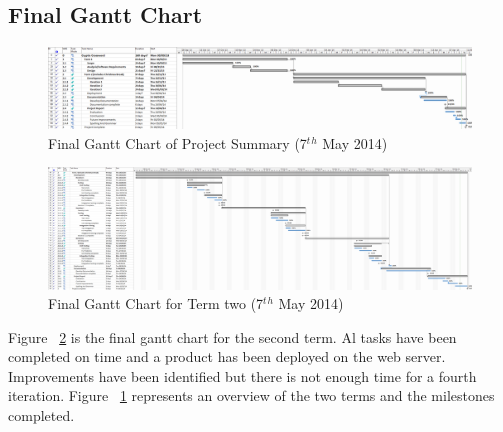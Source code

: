 \begin{landscape}
\subsection{Final Gantt Chart}

\begin{figure}[H]
  \centering
  \includegraphics[width=\linewidth]{images/gant_chart_final_overview.png}
  \caption{Final Gantt Chart of Project Summary (7$^t$$^h$ May 2014)}
  \label{fig:ganttfinaloverview}
\end{figure}

\begin{figure}[H]
  \centering
  \includegraphics[width=\linewidth]{images/gant_chart_final_term2.png}
  \caption{Final Gantt Chart for Term two (7$^t$$^h$ May 2014)}
  \label{fig:ganttfinalterm2}
\end{figure}

Figure ~\ref{fig:ganttfinalterm2} is the final gantt chart for the second term. Al tasks have been completed on time and a product has been deployed on the web server. Improvements have been identified but there is not enough time for a fourth iteration. Figure ~\ref{fig:ganttfinaloverview} represents an overview of the two terms and the milestones completed.

\end{landscape}
